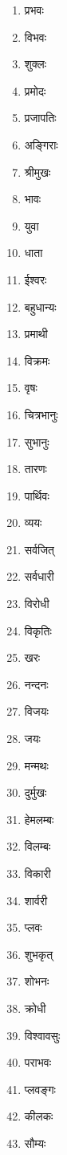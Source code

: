 \begin{multicols}{3}
  \begin{enumerate}\itemsep-1ex
    \item प्रभवः
    \item विभवः
    \item शुक्लः
    \item प्रमोदः
    \item प्रजापतिः
    \item अङ्गिराः
    \item श्रीमुखः
    \item भावः
    \item युवा
    \item धाता
    \item ईश्वरः
    \item बहुधान्यः
    \item प्रमाथी
    \item विक्रमः
    \item वृषः
    \item चित्रभानुः
    \item सुभानुः
    \item तारणः
    \item पार्थिवः
    \item व्ययः
    \item सर्वजित्
    \item सर्वधारी
    \item विरोधी
    \item विकृतिः
    \item खरः
    \item नन्दनः
    \item विजयः
    \item जयः
    \item मन्मथः
    \item दुर्मुखः
    \item हेमलम्बः
    \item विलम्बः
    \item विकारी
    \item शार्वरी
    \item प्लवः
    \item शुभकृत्
    \item शोभनः
    \item क्रोधी
    \item विश्वावसुः
    \item पराभवः
    \item प्लवङ्गः
    \item कीलकः
    \item सौम्यः

\end{enumerate}
\end{multicols}
